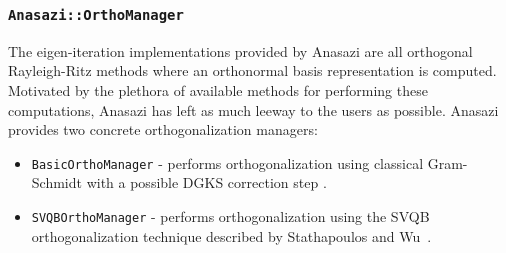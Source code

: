 \documentclass[acmtoms]{acmtrans2m}
\newcommand{\aspace}[1]{\texttt{#1}}
\begin{document}
\subsubsection{\aspace{Anasazi::OrthoManager}}

The eigen-iteration implementations provided by Anasazi are all orthogonal 
Rayleigh-Ritz methods where an orthonormal basis representation is computed. 
Motivated by the plethora of available methods for performing these 
computations, Anasazi has left as much leeway to the users as possible. 
Anasazi provides two concrete orthogonalization managers:
\begin{itemize}
\item
  \aspace{BasicOrthoManager} - performs orthogonalization using
  classical Gram-Schmidt with a possible DGKS correction step \cite{dgks:76}.
\item
  \aspace{SVQBOrthoManager} - performs orthogonalization using the
  SVQB orthogonalization technique described by Stathapoulos and
  Wu~\cite{Stathopoulos:2002:BOP}.
\end{itemize}





\end{document}
